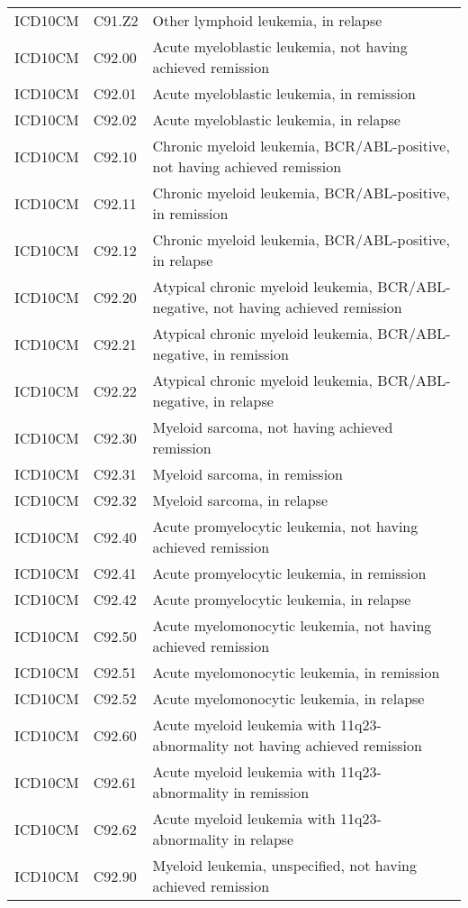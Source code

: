 \begin{longtable}{p{}p{}p{}}
  ICD10CM & C91.Z2 & Other lymphoid leukemia, in relapse \\ 
  ICD10CM & C92.00 & Acute myeloblastic leukemia, not having achieved remission \\ 
  ICD10CM & C92.01 & Acute myeloblastic leukemia, in remission \\ 
  ICD10CM & C92.02 & Acute myeloblastic leukemia, in relapse \\ 
  ICD10CM & C92.10 & Chronic myeloid leukemia, BCR/ABL-positive, not having achieved remission \\ 
  ICD10CM & C92.11 & Chronic myeloid leukemia, BCR/ABL-positive, in remission \\ 
  ICD10CM & C92.12 & Chronic myeloid leukemia, BCR/ABL-positive, in relapse \\ 
  ICD10CM & C92.20 & Atypical chronic myeloid leukemia, BCR/ABL-negative, not having achieved remission \\ 
  ICD10CM & C92.21 & Atypical chronic myeloid leukemia, BCR/ABL-negative, in remission \\ 
  ICD10CM & C92.22 & Atypical chronic myeloid leukemia, BCR/ABL-negative, in relapse \\ 
  ICD10CM & C92.30 & Myeloid sarcoma, not having achieved remission \\ 
  ICD10CM & C92.31 & Myeloid sarcoma, in remission \\ 
  ICD10CM & C92.32 & Myeloid sarcoma, in relapse \\ 
  ICD10CM & C92.40 & Acute promyelocytic leukemia, not having achieved remission \\ 
  ICD10CM & C92.41 & Acute promyelocytic leukemia, in remission \\ 
  ICD10CM & C92.42 & Acute promyelocytic leukemia, in relapse \\ 
  ICD10CM & C92.50 & Acute myelomonocytic leukemia, not having achieved remission \\ 
  ICD10CM & C92.51 & Acute myelomonocytic leukemia, in remission \\ 
  ICD10CM & C92.52 & Acute myelomonocytic leukemia, in relapse \\ 
  ICD10CM & C92.60 & Acute myeloid leukemia with 11q23-abnormality not having achieved remission \\ 
  ICD10CM & C92.61 & Acute myeloid leukemia with 11q23-abnormality in remission \\ 
  ICD10CM & C92.62 & Acute myeloid leukemia with 11q23-abnormality in relapse \\ 
  ICD10CM & C92.90 & Myeloid leukemia, unspecified, not having achieved remission \\ 

\end{longtable}
